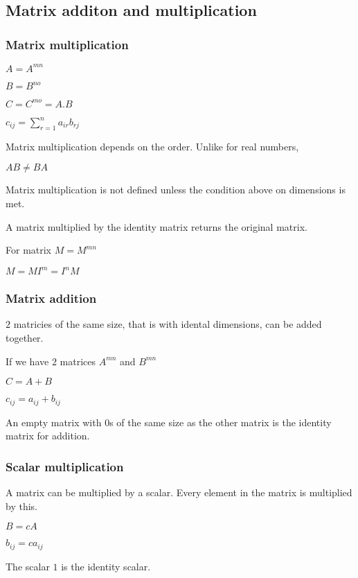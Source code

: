 
\subsection{Matrix additon and multiplication}

\subsubsection{Matrix multiplication}

\(A=A^{mn}\)

\(B=B^{no}\)

\(C=C^{mo}=A.B\)

\(c_{ij}=\sum_{r=1}^na_{ir}b_{rj}\)

Matrix multiplication depends on the order. Unlike for real numbers, 

\(AB\ne BA\)

Matrix multiplication is not defined unless the condition above on dimensions is met.

A matrix multiplied by the identity matrix returns the original matrix.

For matrix \(M=M^{mn}\)

\(M=MI^m=I^nM\)

\subsubsection{Matrix addition}

\(2\) matricies of the same size, that is with idental dimensions, can be added together.

If we have \(2\) matrices \(A^{mn}\) and \(B^{mn}\)

\(C=A+B\)

\(c_{ij}=a_{ij}+b_{ij}\)

An empty matrix with \(0\)s of the same size as the other matrix is the identity matrix for addition.

\subsubsection{Scalar multiplication}

A matrix can be multiplied by a scalar. Every element in the matrix is multiplied by this.

\(B=cA\)

\(b_{ij}=ca_{ij}\)

The scalar \(1\) is the identity scalar.

